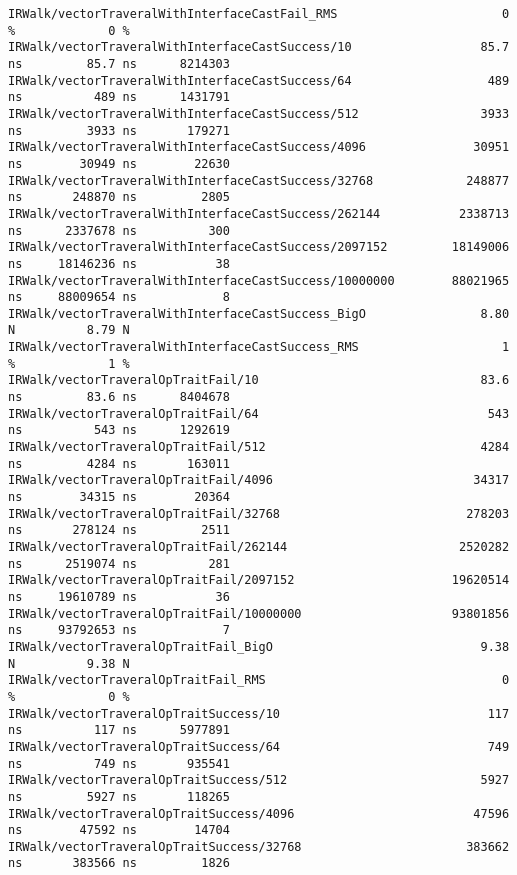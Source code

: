 \begin{code}
\begin{verbatim}
IRWalk/vectorTraveralWithInterfaceCastFail_RMS                       0 %             0 %
IRWalk/vectorTraveralWithInterfaceCastSuccess/10                  85.7 ns         85.7 ns      8214303
IRWalk/vectorTraveralWithInterfaceCastSuccess/64                   489 ns          489 ns      1431791
IRWalk/vectorTraveralWithInterfaceCastSuccess/512                 3933 ns         3933 ns       179271
IRWalk/vectorTraveralWithInterfaceCastSuccess/4096               30951 ns        30949 ns        22630
IRWalk/vectorTraveralWithInterfaceCastSuccess/32768             248877 ns       248870 ns         2805
IRWalk/vectorTraveralWithInterfaceCastSuccess/262144           2338713 ns      2337678 ns          300
IRWalk/vectorTraveralWithInterfaceCastSuccess/2097152         18149006 ns     18146236 ns           38
IRWalk/vectorTraveralWithInterfaceCastSuccess/10000000        88021965 ns     88009654 ns            8
IRWalk/vectorTraveralWithInterfaceCastSuccess_BigO                8.80 N          8.79 N
IRWalk/vectorTraveralWithInterfaceCastSuccess_RMS                    1 %             1 %
IRWalk/vectorTraveralOpTraitFail/10                               83.6 ns         83.6 ns      8404678
IRWalk/vectorTraveralOpTraitFail/64                                543 ns          543 ns      1292619
IRWalk/vectorTraveralOpTraitFail/512                              4284 ns         4284 ns       163011
IRWalk/vectorTraveralOpTraitFail/4096                            34317 ns        34315 ns        20364
IRWalk/vectorTraveralOpTraitFail/32768                          278203 ns       278124 ns         2511
IRWalk/vectorTraveralOpTraitFail/262144                        2520282 ns      2519074 ns          281
IRWalk/vectorTraveralOpTraitFail/2097152                      19620514 ns     19610789 ns           36
IRWalk/vectorTraveralOpTraitFail/10000000                     93801856 ns     93792653 ns            7
IRWalk/vectorTraveralOpTraitFail_BigO                             9.38 N          9.38 N
IRWalk/vectorTraveralOpTraitFail_RMS                                 0 %             0 %
IRWalk/vectorTraveralOpTraitSuccess/10                             117 ns          117 ns      5977891
IRWalk/vectorTraveralOpTraitSuccess/64                             749 ns          749 ns       935541
IRWalk/vectorTraveralOpTraitSuccess/512                           5927 ns         5927 ns       118265
IRWalk/vectorTraveralOpTraitSuccess/4096                         47596 ns        47592 ns        14704
IRWalk/vectorTraveralOpTraitSuccess/32768                       383662 ns       383566 ns         1826

\end{verbatim}
\end{code}
